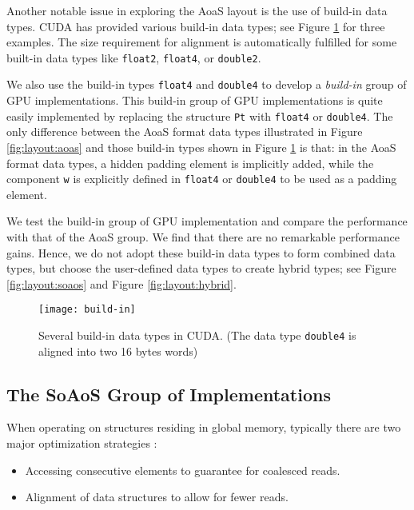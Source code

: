 Another notable issue in exploring the AoaS layout is the use of build-in data types. CUDA has provided various build-in data types; see Figure \ref{fig:layout:buildin} for three examples. The size requirement for alignment is automatically fulfilled for some built-in data types like \texttt{float2}, \texttt{float4}, or \texttt{double2}. 

We also use the build-in types \texttt{float4} and \texttt{double4} to develop a \textit{build-in} group of GPU implementations. This build-in group of GPU implementations is quite easily implemented by replacing the structure \texttt{Pt} with \texttt{float4} or \texttt{double4}. The only difference between the AoaS format data types illustrated in Figure \ref{fig:layout:aoas} and those build-in types shown in Figure \ref{fig:layout:buildin} is that: in the AoaS format data types, a hidden padding element is implicitly added, while the component \texttt{w} is explicitly defined in \texttt{float4} or \texttt{double4} to be used as a padding element. 

We test the build-in group of GPU implementation and compare the performance with that of the AoaS group. We find that there are no remarkable performance gains. Hence, we do not adopt these build-in data types to form combined data types, but choose the user-defined data types to create hybrid types; see Figure \ref{fig:layout:soaos} and Figure \ref{fig:layout:hybrid}.


\begin{figure}[htb]
\centering
    \texttt{[image: build-in]}
    \caption{Several build-in data types in CUDA. (The data type \texttt{double4} is aligned into two 16 bytes words)}
    \label{fig:layout:buildin}       \end{figure}

\subsection{The SoAoS Group of Implementations}
\label{sec:implement:soaos}

When operating on structures residing in global memory, typically there are 
two major optimization strategies \cite{siegel2009}:

\begin{itemize}
\item Accessing consecutive elements to guarantee for coalesced reads.

\item Alignment of data structures to allow for fewer reads.
\end{itemize}


